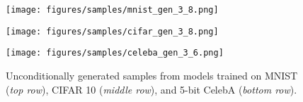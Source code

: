 \documentclass{article}
\begin{document}
\begin{table*}[ht]
\centering
{}
\caption{\small Evaluation on Inception Score (IS, the higher the better) and Fréchet Inception Distance (FID, the lower the better) of models trained on CIFAR 10. Results taken from ${}^1$\citet{ostrovski2018autoregressive}, ${}^2$\citet{chen2019residualflows}, ${}^3$\citet{vaeflow}, and ${}^4$\citet{gulrajani2017improved,heusel2017gans}. 
Parenthesis indicates two time-scale update rule for WGAN-GP.
}
\label{tab:scores}
\end{table*}
\begin{figure}[t!]
    \centering
\texttt{[image: figures/samples/mnist\_gen\_3\_8.png]}
    
    \vspace{1mm}
    
\texttt{[image: figures/samples/cifar\_gen\_3\_8.png]}
    
    \vspace{1mm}
    
\texttt{[image: figures/samples/celeba\_gen\_3\_6.png]}
    \vspace{-3mm}
    \caption{\small Unconditionally generated samples from models trained on MNIST (\emph{top row}), CIFAR 10 (\emph{middle row}), and 5-bit CelebA (\emph{bottom row}). 
}
    \label{fig:samples}
\end{figure}
\end{document}
